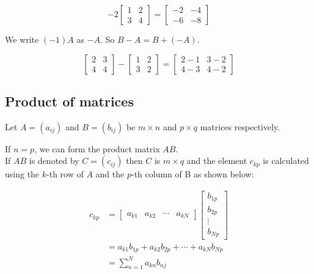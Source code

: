 \documentclass[11pt]{article}
\begin{document}
\begin{displaymath}
-2 \begin{bmatrix}
1 & 2 \\
3 & 4
\end{bmatrix} = \begin{bmatrix}
-2 & -4 \\
-6 & -8
\end{bmatrix}
\end{displaymath}

We write \((-1)A\) as \(-A\). So \(B - A = B + (- A)\).

\begin{displaymath}
\begin{bmatrix}
2 & 3 \\
4 & 4
\end{bmatrix} - \begin{bmatrix}
1 & 2 \\
3 & 2
\end{bmatrix} = \begin{bmatrix}
2 - 1 & 3 - 2 \\
4 - 3 & 4 - 2
\end{bmatrix}
\end{displaymath}

 \newpage

\subsection{Product of matrices}
\label{sec:org4bbd97c}
Let \(A = (a_{ij})\) and \(B = (b_{ij})\) be \(m \times n\) and \(p \times q\) matrices respectively.

If \(n = p\), we can form the product matrix \(AB\).
\\[0pt]

If \(AB\) is denoted by \(C = (c_{ij})\) then \(C\) is \(m \times q\) and the element \(c_{kp}\) is calculated using the \(k\)-th row of \(A\) and the \(p\)-th column of B as shown below:

\begin{align*}
c_{kp} &= \begin{bmatrix}
a_{k1} & a_{k2} & \cdots & a_{kN}
\end{bmatrix} \begin{bmatrix}
b_{1p} \\
b_{2p} \\
\vdots \\
b_{Np}
\end{bmatrix} \\
&= a_{k1} b_{1p} + a_{k2} b_{2p} + \cdots + a_{kN} b_{Np} \\
&= \sum_{n=1}^{N} a_{kn} b_{nj}
\end{align*}
\end{document}
